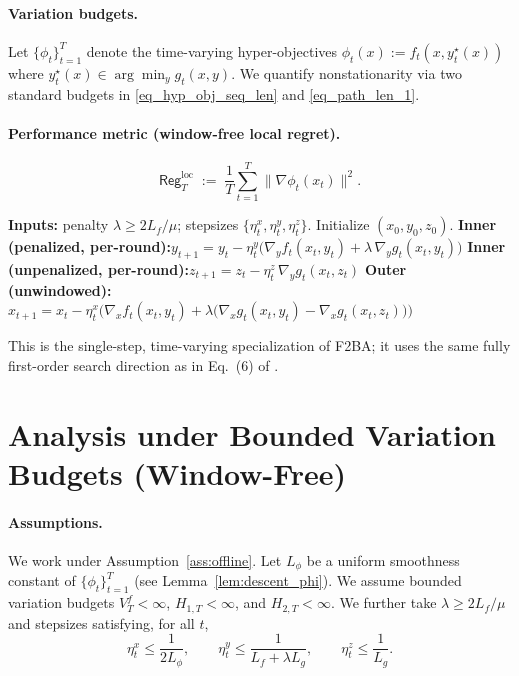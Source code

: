 \documentclass{uai2026} %
\begin{document}
\paragraph{Variation budgets.}
Let $\{\phi_t\}_{t=1}^T$ denote the time-varying hyper-objectives
$\phi_t(x) := f_t(x, y_t^\star(x))$ where $y_t^\star(x)\in\arg\min_y g_t(x,y)$.
We quantify nonstationarity via two standard budgets in \eqref{eq_hyp_obj_seq_len} and \eqref{eq_path_len_1}.

\paragraph{Performance metric (window-free local regret).}
\[
\mathsf{Reg}^{\mathrm{loc}}_{T}
\;:=\;
\frac{1}{T}\sum_{t=1}^{T}\bigl\|\nabla\phi_t(x_t)\bigr\|^2.
\]

\begin{algorithm}[H]
\caption{F$^2$OBO (outer \emph{unwindowed}; inner per-round)}
\label{alg:f2obo-perround-inner-windowfree}
\begin{algorithmic}[1]
\State \textbf{Inputs:} penalty $\lambda\ge 2L_f/\mu$; stepsizes $\{\eta^x_t,\eta^y_t,\eta^z_t\}$.
Initialize $(x_0,y_0,z_0)$.
\State \textbf{Inner (penalized, per-round):}\quad $y_{t+1}=y_t-\eta^y_t\big(\nabla_y f_t(x_t,y_t)+\lambda\,\nabla_y g_t(x_t,y_t)\big)$
\State \textbf{Inner (unpenalized, per-round):}\quad $z_{t+1}=z_t-\eta^z_t\,\nabla_y g_t(x_t,z_t)$
\State \textbf{Outer (unwindowed):}\quad
$x_{t+1}=x_t-\eta^x_t\Big(\nabla_x f_t(x_t,y_t)+\lambda\big(\nabla_x g_t(x_t,y_t)-\nabla_x g_t(x_t,z_t)\big)\Big)$
\EndFor
\end{algorithmic}
\end{algorithm}

This is the single-step, time-varying specialization of F2BA; it uses the same fully first-order search direction as in Eq.~(6) of \citet{ChenMaZhang2025}.

\section{Analysis under Bounded Variation Budgets (Window-Free)}
\label{sec:windowfree-analysis}

\paragraph{Assumptions.}
We work under Assumption~\ref{ass:offline}. Let $L_\phi$ be a uniform smoothness constant of $\{\phi_t\}_{t=1}^T$
(see Lemma~\ref{lem:descent_phi}).
We assume bounded variation budgets $V_T^f<\infty$, $H_{1,T}<\infty$, and $H_{2,T}<\infty$.
We further take $\lambda\ge 2L_f/\mu$ and stepsizes satisfying, for all $t$,
\[
\eta_t^x\le \frac{1}{2L_\phi},\qquad
\eta_t^y\le \frac{1}{L_f+\lambda L_g},\qquad
\eta_t^z\le \frac{1}{L_g}.
\]
\end{document}
